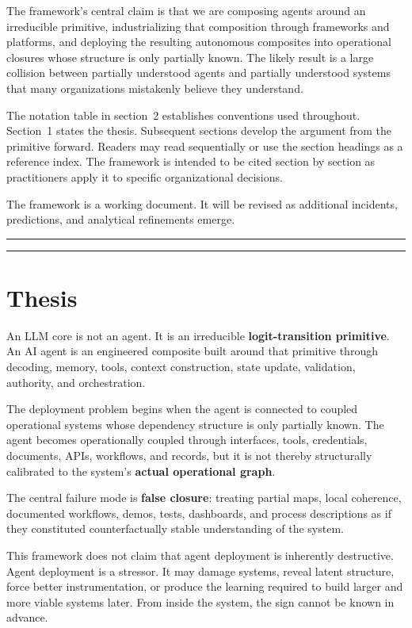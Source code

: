 \documentclass[11pt]{article}
\begin{document}
The framework's central claim is that we are composing agents around an irreducible primitive, industrializing that composition through frameworks and platforms, and deploying the resulting autonomous composites into operational closures whose structure is only partially known. The likely result is a large collision between partially understood agents and partially understood systems that many organizations mistakenly believe they understand.

The notation table in section~2 establishes conventions used throughout. Section~1 states the thesis. Subsequent sections develop the argument from the primitive forward. Readers may read sequentially or use the section headings as a reference index. The framework is intended to be cited section by section as practitioners apply it to specific organizational decisions.

The framework is a working document. It will be revised as additional incidents, predictions, and analytical refinements emerge.

\bigskip
\hrule
\bigskip

\tableofcontents

\bigskip
\hrule
\bigskip

\section{Thesis}

An LLM core is not an agent. It is an irreducible \textbf{logit-transition primitive}. An AI agent is an engineered composite built around that primitive through decoding, memory, tools, context construction, state update, validation, authority, and orchestration.

The deployment problem begins when the agent is connected to coupled operational systems whose dependency structure is only partially known. The agent becomes operationally coupled through interfaces, tools, credentials, documents, APIs, workflows, and records, but it is not thereby structurally calibrated to the system's \textbf{actual operational graph}.

The central failure mode is \textbf{false closure}: treating partial maps, local coherence, documented workflows, demos, tests, dashboards, and process descriptions as if they constituted counterfactually stable understanding of the system.

This framework does not claim that agent deployment is inherently destructive. Agent deployment is a stressor. It may damage systems, reveal latent structure, force better instrumentation, or produce the learning required to build larger and more viable systems later. From inside the system, the sign cannot be known in advance.
\end{document}
